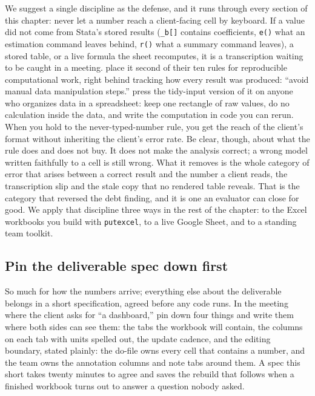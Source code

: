 \documentclass[
    a4paper,
    fontsize=10pt,
    twoside=true,
    numbers=noenddot,
]{kaobook}
\begin{document}
We suggest a single discipline as the defense, and it runs through every section of this chapter: never let a number reach a client-facing cell by keyboard. If a value did not come from Stata's stored results (\texttt{\_b[]} contains coefficients, \texttt{e()} what an estimation command leaves behind, \texttt{r()} what a summary command leaves), a stored table, or a live formula the sheet recomputes, it is a transcription waiting to be caught in a meeting. \textcite{sandve2013reproducible} place it second of their ten rules for reproducible computational work, right behind tracking how every result was produced: \enquote{avoid manual data manipulation steps.} \textcite{broman2018spreadsheets} press the tidy-input version of it on anyone who organizes data in a spreadsheet: keep one rectangle of raw values, do no calculation inside the data, and write the computation in code you can rerun. When you hold to the never-typed-number rule, you get the reach of the client's format without inheriting the client's error rate. Be clear, though, about what the rule does and does not buy. It does not make the analysis correct; a wrong model written faithfully to a cell is still wrong. What it removes is the whole category of error that arises between a correct result and the number a client reads, the transcription slip and the stale copy that no rendered table reveals. That is the category that reversed the debt finding, and it is one an evaluator can close for good. We apply that discipline three ways in the rest of the chapter: to the Excel workbooks you build with \texttt{putexcel}, to a live Google Sheet, and to a standing team toolkit.

\subsection{Pin the deliverable spec down first}\label{sec:ch11-spec}
So much for how the numbers arrive; everything else about the deliverable belongs in a short specification, agreed before any code runs. In the meeting where the client asks for \enquote{a dashboard,} pin down four things and write them where both sides can see them: the tabs the workbook will contain, the columns on each tab with units spelled out, the update cadence, and the editing boundary, stated plainly: the do-file owns every cell that contains a number, and the team owns the annotation columns and note tabs around them. A spec this short takes twenty minutes to agree and saves the rebuild that follows when a finished workbook turns out to answer a question nobody asked.
\end{document}
